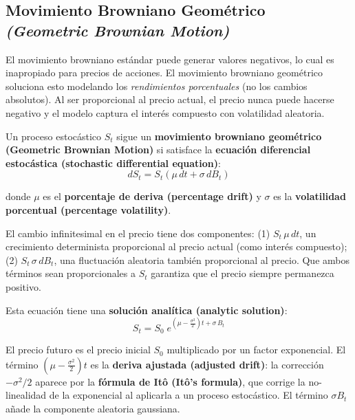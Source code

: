 \documentclass[12pt]{article}
\begin{document}
\subsection{Movimiento Browniano Geom\'etrico \textit{(Geometric Brownian Motion)}}

\begin{intuicion}
El movimiento browniano est\'andar puede generar valores negativos, lo cual es inapropiado para precios de acciones. El movimiento browniano geom\'etrico soluciona esto modelando los \textit{rendimientos porcentuales} (no los cambios absolutos). Al ser proporcional al precio actual, el precio nunca puede hacerse negativo y el modelo captura el inter\'es compuesto con volatilidad aleatoria.
\end{intuicion}

Un proceso estoc\'astico $S_t$ sigue un \textbf{movimiento browniano geom\'etrico (Geometric Brownian Motion)} si satisface la \textbf{ecuaci\'on diferencial estoc\'astica (stochastic differential equation)}:
\begin{equation}
  dS_t = S_t\!\left(\mu\,dt + \sigma\,dB_t\right)
\end{equation}

donde $\mu$ es el \textbf{porcentaje de deriva (percentage drift)} y $\sigma$ es la \textbf{volatilidad porcentual (percentage volatility)}.

\begin{intuicionmat}
El cambio infinitesimal en el precio tiene dos componentes: (1) $S_t\,\mu\,dt$, un crecimiento determinista proporcional al precio actual (como inter\'es compuesto); (2) $S_t\,\sigma\,dB_t$, una fluctuaci\'on aleatoria tambi\'en proporcional al precio. Que ambos t\'erminos sean proporcionales a $S_t$ garantiza que el precio siempre permanezca positivo.
\end{intuicionmat}

Esta ecuaci\'on tiene una \textbf{soluci\'on anal\'itica (analytic solution)}:
\begin{equation}
  S_t = S_0\; e^{\left(\mu - \frac{\sigma^2}{2}\right)t + \sigma\, B_t}
\end{equation}

\begin{intuicionmat}
El precio futuro es el precio inicial $S_0$ multiplicado por un factor exponencial. El t\'ermino $\left(\mu - \frac{\sigma^2}{2}\right)t$ es la \textbf{deriva ajustada (adjusted drift)}: la correcci\'on $-\sigma^2/2$ aparece por la \textbf{f\'ormula de It\^o (It\^o's formula)}, que corrige la no-linealidad de la exponencial al aplicarla a un proceso estoc\'astico. El t\'ermino $\sigma B_t$ a\~nade la componente aleatoria gaussiana.
\end{intuicionmat}
\end{document}
